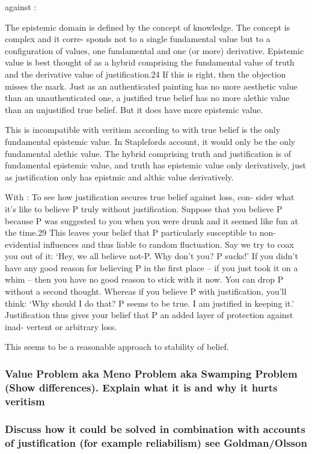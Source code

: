 \documentclass[12pt,numbers=noenddot]{scrartcl}
\begin{document}
against \textcite[291]{Stapleford2016}:

The epistemic domain is defined by the concept of knowledge. The concept is complex and it corre- sponds not to a single fundamental value but to a configuration of values, one fundamental and one (or more) derivative. Epistemic value is best thought of as a hybrid comprising the fundamental value of truth and the derivative value of justification.24 If this is right, then the objection misses the mark. Just as an authenticated painting has no more aesthetic value than an unauthenticated one, a justified true belief has no more alethic value than an unjustified true belief. But it does have more epistemic value.

This is incompatible with veritism according to with true belief is the only fundamental epistemic value. In Staplefords account, it would only be the only fundamental alethic value. The hybrid comprising truth and justification is of fundamental epistemic value, and truth has epistemic value only derivatively, just as justification only has epistmic and althic value derivatively.

With \textcite{Stapleford2016}:
To see how justification secures true belief against loss, con- sider what it’s like to believe P truly without justification. Suppose that you believe P because P was suggested to you when you were drunk and it seemed like fun at the time.29 This leaves your belief that P particularly susceptible to non-evidential influences and thus liable to random fluctuation. Say we try to coax you out of it: ‘Hey, we all believe not-P. Why don’t you? P sucks!’ If you didn’t have any good reason for believing P in the first place – if you just took it on a whim – then you have no good reason to stick with it now. You can drop P without a second thought. Whereas if you believe P with justification, you’ll think: ‘Why should I do that? P seems to be true. I am justified in keeping it.’ Justification thus gives your belief that P an added layer of protection against inad- vertent or arbitrary loss.

This seems to be a reasonable approach to stability of belief.


\subsubsection{ Value Problem aka Meno Problem aka Swamping Problem (Show differences). Explain what it is and why it hurts veritism }
\subsubsection{ Discuss how it could be solved in combination with accounts of justification (for example reliabilism) see Goldman/Olsson}
\end{document}

